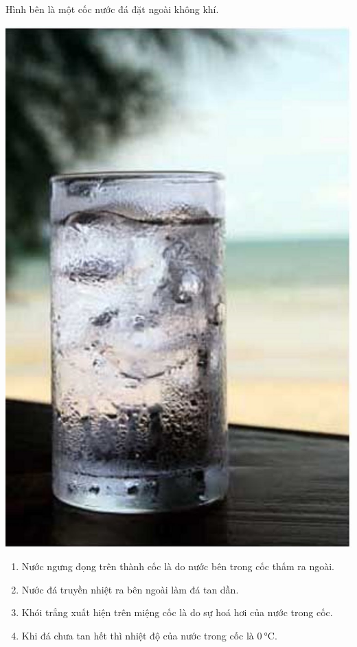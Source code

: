\begin{ex}
	Hình bên là một cốc nước đá đặt ngoài không khí.
	\begin{center}
		\includegraphics[width=0.2\linewidth]{figs/VN12-Y24-PH-SYL-001P-3}
	\end{center}

	\begin{enumerate}[label=\alph*)]
		\item 
		Nước ngưng đọng trên thành cốc là do nước bên trong cốc thấm ra ngoài.
		\item Nước đá truyền nhiệt ra bên ngoài làm đá tan dần.
		\item Khói trắng xuất hiện trên miệng cốc là do sự hoá hơi của nước trong cốc.
		\item Khi đá chưa tan hết thì nhiệt độ của nước trong cốc là $\SI{0}{\celsius}$.
	\end{enumerate}
	\end{ex}
